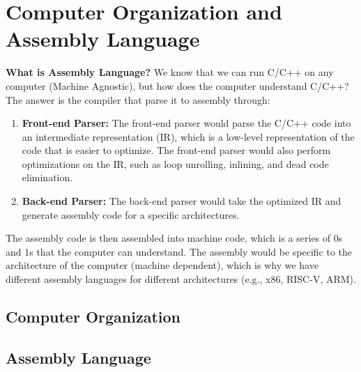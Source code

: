 \documentclass[11pt]{report}
\begin{document}
\chapter{Computer Organization and Assembly Language}
\begin{shaded}
\textbf{What is Assembly Language?} We know that we can run C/C++ on any computer (Machine Agnostic), but how does the computer understand C/C++? The answer is the compiler that parse it to assembly through:

\begin{enumerate}
    \item \textbf{Front-end Parser:} The front-end parser would parse the C/C++ code into an intermediate representation (IR), which is a low-level representation of the code that is easier to optimize. The front-end parser would also perform optimizations on the IR, such as loop unrolling, inlining, and dead code elimination.
    \item \textbf{Back-end Parser:} The back-end parser would take the optimized IR and generate assembly code for a specific architectures.
\end{enumerate}
\end{shaded}
The assembly code is then assembled into machine code, which is a series of 0s and 1s that the computer can understand. The assembly would be specific to the architecture of the computer (machine dependent), which is why we have different assembly languages for different architectures (e.g., x86, RISC-V, ARM).
\section{Computer Organization}
\section{Assembly Language}
\end{document}
